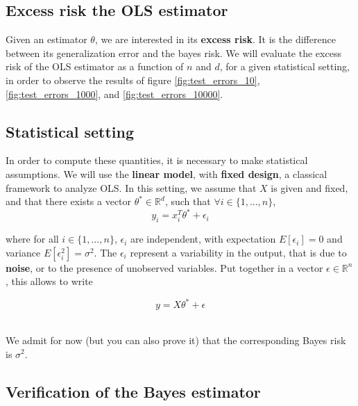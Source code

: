 \documentclass[
10pt, %
a4paper, %
oneside, %
headinclude,footinclude, %
BCOR5mm, %
]{scrartcl}
\begin{document}

\subsection{Excess risk the OLS estimator}

Given an estimator $\theta$, we are interested in its \textbf{excess risk}. It is the
difference between its generalization error and the bayes risk. We will evaluate the excess risk of the OLS estimator as a function of $n$ and $d$, for a given statistical setting, in order to observe the results of figure \ref{fig:test_errors_10}, \ref{fig:test_errors_1000}, and
\ref{fig:test_errors_10000}.

\subsection{Statistical setting}%
\label{ssub:Statistical setting}

In order to compute these quantities, it is necessary to make statistical
assumptions. We will use the \textbf{{linear model}}, with \textbf{{fixed
design}}, a classical framework to analyze OLS. In this setting, we assume that
$X$ is given and fixed, and that there exists a vector $ \theta^*\in \mathbb{R}^d$, such that $\forall i\in \{1, \dots, n\}$, 
\begin{equation}
    y_i = x_i^T\theta^*+\epsilon_i
\end{equation}

where for all $i\in \{1, \dots, n\}$, $\epsilon_i$ are independent, with
expectation $E[\epsilon_i]=0$ and variance $E[\epsilon_i^2]=\sigma^2$. The
$\epsilon_i$ represent a variability in the output, that is due to
\textbf{{noise}}, or to the presence of unobserved variables. Put together in a
vector $\epsilon\in \mathbb{R}^n$, this allows to write

\begin{equation}
    y = X\theta^*+\epsilon
\end{equation}

{\color{Purple}{Considering the previous practical session observations, what do
we expect to be the Bayes estimator ?}}
\\

We admit for now (but you can also prove it) that the corresponding Bayes risk is $\sigma^2$.
\\

\subsection{Verification of the Bayes estimator}%
\label{sub:Verification of the Bayes estimator}
\end{document}
